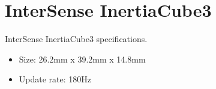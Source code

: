 \chapter{InterSense InertiaCube3}
\label{AppendixC}

InterSense InertiaCube3 specifications.

\begin{itemize}
\item Size: 26.2mm x 39.2mm x 14.8mm
\item Update rate: 180Hz
\end{itemize}

